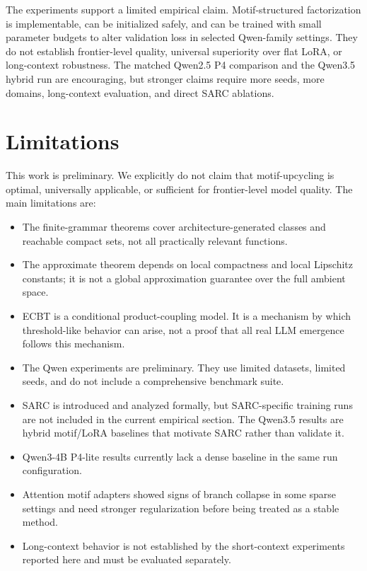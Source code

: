 \documentclass[11pt]{article}
\theoremstyle{definition}
\begin{document}
The experiments support a limited empirical claim. Motif-structured factorization is implementable, can be initialized safely, and can be trained with small parameter budgets to alter validation loss in selected Qwen-family settings. They do not establish frontier-level quality, universal superiority over flat LoRA, or long-context robustness. The matched Qwen2.5 P4 comparison and the Qwen3.5 hybrid run are encouraging, but stronger claims require more seeds, more domains, long-context evaluation, and direct SARC ablations.

\section{Limitations}

This work is preliminary. We explicitly do not claim that motif-upcycling is optimal, universally applicable, or sufficient for frontier-level model quality. The main limitations are:
\begin{itemize}
  \item The finite-grammar theorems cover architecture-generated classes and reachable compact sets, not all practically relevant functions.
  \item The approximate theorem depends on local compactness and local Lipschitz constants; it is not a global approximation guarantee over the full ambient space.
  \item ECBT is a conditional product-coupling model. It is a mechanism by which threshold-like behavior can arise, not a proof that all real LLM emergence follows this mechanism.
  \item The Qwen experiments are preliminary. They use limited datasets, limited seeds, and do not include a comprehensive benchmark suite.
  \item SARC is introduced and analyzed formally, but SARC-specific training runs are not included in the current empirical section. The Qwen3.5 results are hybrid motif/LoRA baselines that motivate SARC rather than validate it.
  \item Qwen3-4B P4-lite results currently lack a dense baseline in the same run configuration.
  \item Attention motif adapters showed signs of branch collapse in some sparse settings and need stronger regularization before being treated as a stable method.
  \item Long-context behavior is not established by the short-context experiments reported here and must be evaluated separately.
\end{itemize}
\end{document}

